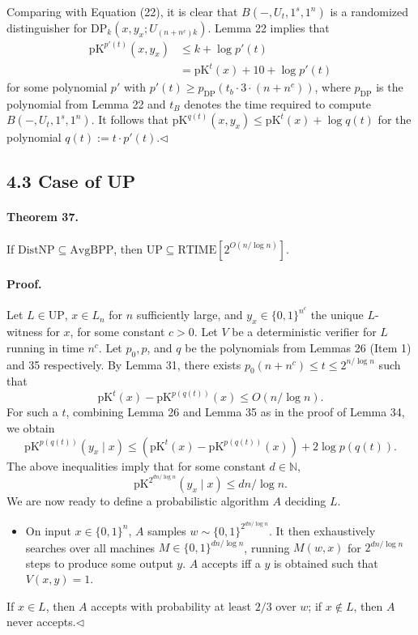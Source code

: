 Comparing with Equation (22), it is clear that $B(-,U_t,1^s,1^n)$ is a randomized distinguisher for $\mathrm{DP}_k(x,y_x;U_{(n+n^c)k})$. Lemma 22 implies that
\begin{align*}
\mathrm{pK}^{p'(t)}(x,y_x)&\leq k+\log p'(t)\\
&=\mathrm{pK}^t(x)+10+\log p'(t)
\end{align*}
for some polynomial $p'$ with $p'(t)\geq p_{\mathrm{DP}}(t_b\cdot3\cdot(n+n^c))$, where $p_{\mathrm{DP}}$ is the polynomial from Lemma 22 and $t_B$ denotes the time required to compute $B(-,U_t,1^s,1^n)$. It follows that $\mathrm{pK}^{q(t)}(x,y_x)\leq\mathrm{pK}^t(x)+\log q(t)$ for the polynomial $q(t):=t\cdot p'(t)$.\hfill$\triangleleft$
\subsection*{4.3 Case of UP}
\paragraph{Theorem 37.} If $\mathrm{DistNP}\subseteq\mathrm{AvgBPP}$, then $\mathrm{UP}\subseteq\mathrm{RTIME}[2^{O(n/\log n)}]$.
\paragraph{Proof.} Let $L\in\mathrm{UP}$, $x\in L_n$ for $n$ sufficiently large, and $y_x\in\{0,1\}^{n^c}$ the unique $L$-witness for $x$, for some constant $c>0$. Let $V$ be a deterministic verifier for $L$ running in time $n^c$. Let $p_0,p$, and $q$ be the polynomials from Lemmas 26 (Item 1) and 35 respectively.
By Lemma 31, there exists $p_0(n+n^c)\leq t\leq2^{n/\log n}$ such that
\[\mathrm{pK}^t(x)-\mathrm{pK}^{p(q(t))}(x)\leq O(n/\log n).\]
For such a $t$, combining Lemma 26 and Lemma 35 as in the proof of Lemma 34, we obtain
\[\mathrm{pK}^{p(q(t))}(y_x\mid x)\leq(\mathrm{pK}^t(x)-\mathrm{pK}^{p(q(t))}(x))+2\log p(q(t)).\]
The above inequalities imply that for some constant $d\in\mathbb N$,
\[\mathrm{pK}^{2^{dn/\log n}}(y_x\mid x)\leq dn/\log n.\]
We are now ready to define a probabilistic algorithm $A$ deciding $L$.
\begin{itemize}
\item On input $x\in\{0,1\}^n$, $A$ samples $w\sim\{0,1\}^{2^{dn/\log n}}$. It then exhaustively searches over all machines $M\in\{0,1\}^{dn/\log n}$, running $M(w,x)$ for $2^{dn/\log n}$ steps to produce some output $y$. $A$ accepts iff a $y$ is obtained such that $V(x,y)=1$.
\end{itemize}
If $x\in L$, then $A$ accepts with probability at least $2/3$ over $w$; if $x\notin L$, then $A$ never accepts.\hfill$\triangleleft$
